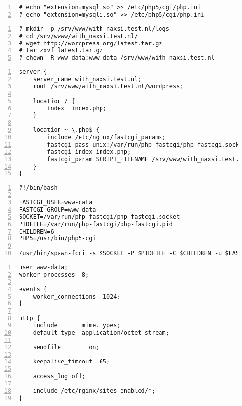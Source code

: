 \documentclass[Configuration]{subfiles}
\begin{document}
\begin{lstlisting}[frame=single,caption=/etc/php5/cgi/php.ini,backgroundcolor=\color{gray},breaklines=true,numbers=left,]
# echo "extension=mysql.so" >> /etc/php5/cgi/php.ini
# echo "extension=mysqli.so" >> /etc/php5/cgi/php.ini
\end{lstlisting}

\begin{lstlisting}[frame=single,caption=Wordpress 3.5.1 installation,backgroundcolor=\color{gray},breaklines=true,numbers=left,]
# mkdir -p /srv/www/with_naxsi.test.nl/logs
# cd /srv/wwww/with_naxsi.test.nl/
# wget http://wordpress.org/latest.tar.gz
# tar zxvf latest.tar.gz 
# chown -R www-data:www-data /srv/www/with_naxsi.test.nl
\end{lstlisting}

\begin{lstlisting}[frame=single,caption=/etc/nginx/sites-enabled/with\_naxsi.test.nl,backgroundcolor=\color{gray},breaklines=true,numbers=left,]
server {
    server_name with_naxsi.test.nl;
    root /srv/www/with_naxsi.test.nl/wordpress;

    location / {
        index  index.php;
    }

    location ~ \.php$ {
        include /etc/nginx/fastcgi_params;
        fastcgi_pass unix:/var/run/php-fastcgi/php-fastcgi.socket;
        fastcgi_index index.php;
        fastcgi_param SCRIPT_FILENAME /srv/www/with_naxsi.test.nl/wordpress$fastcgi_script_name;
    }
}
\end{lstlisting}

\begin{lstlisting}[frame=single,caption=/usr/bin/php-fastcgi (needs chmod +x /usr/bin/php-fastcgi),backgroundcolor=\color{gray},breaklines=true,numbers=left,]
#!/bin/bash

FASTCGI_USER=www-data
FASTCGI_GROUP=www-data
SOCKET=/var/run/php-fastcgi/php-fastcgi.socket
PIDFILE=/var/run/php-fastcgi/php-fastcgi.pid
CHILDREN=6
PHP5=/usr/bin/php5-cgi

/usr/bin/spawn-fcgi -s $SOCKET -P $PIDFILE -C $CHILDREN -u $FASTCGI_USER -g $FASTCGI_GROUP -f $PHP5
\end{lstlisting}

\begin{lstlisting}[frame=single,caption=/etc/nginx/nginx.conf,backgroundcolor=\color{gray},breaklines=true,numbers=left,]
user www-data;
worker_processes  8;

events {
    worker_connections  1024;
}

http {
    include       mime.types;
    default_type  application/octet-stream;

    sendfile        on;

    keepalive_timeout  65;

    access_log off;

    include /etc/nginx/sites-enabled/*;
}
\end{lstlisting}
\end{document}
